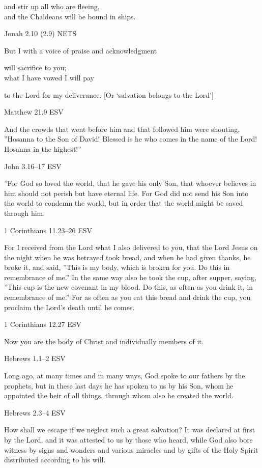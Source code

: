 \documentclass[
]{article}
\newcommand{\RL}[1]{\beginR #1\endR}
\begin{document}
and stir up all who are fleeing,\\
and the Chaldeans will be bound in ships.

Jonah 2.10 (2.9) NETS

But I with a voice of praise and acknowledgment

will sacrifice to you;\\
what I have vowed I will pay

to the Lord for my deliverance. {[}Or `salvation belongs to the Lord'{]}

Matthew 21.9 ESV

And the crowds that went before him and that followed him were shouting,
\RL{''}Hosanna to the Son of David! Blessed is he who comes in the name
of the Lord! Hosanna in the highest!''

John 3.16--17 ESV

\RL{''}For God so loved the world, that he gave his only Son, that
whoever believes in him should not perish but have eternal life. For God
did not send his Son into the world to condemn the world, but in order
that the world might be saved through him.

1 Corinthians 11.23--26 ESV

For I received from the Lord what I also delivered to you, that the Lord
Jesus on the night when he was betrayed took bread, and when he had
given thanks, he broke it, and said, \RL{''}This is my body, which is
broken for you. Do this in remembrance of me.'' In the same way also he
took the cup, after supper, saying, \RL{''}This cup is the new covenant
in my blood. Do this, as often as you drink it, in remembrance of me.''
For as often as you eat this bread and drink the cup, you proclaim the
Lord\RL{'}s death until he comes.

1 Corinthians 12.27 ESV

Now you are the body of Christ and individually members of it.

Hebrews 1.1--2 ESV

Long ago, at many times and in many ways, God spoke to our fathers by
the prophets, but in these last days he has spoken to us by his Son,
whom he appointed the heir of all things, through whom also he created
the world.

Hebrews 2.3--4 ESV

How shall we escape if we neglect such a great salvation? It was
declared at first by the Lord, and it was attested to us by those who
heard, while God also bore witness by signs and wonders and various
miracles and by gifts of the Holy Spirit distributed according to his
will.
\end{document}
